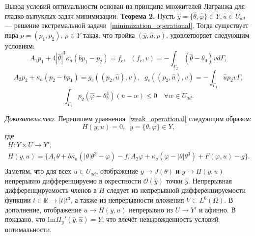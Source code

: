 Вывод условий оптимальности основан на принципе множителей
Лагранжа для гладко-выпуклых задач минимизации.
\textbf{Теорема 2.}
Пусть $\hat{y}=\{\hat{\theta},\hat{\varphi} \} \in Y, \hat{u} \in U_{ad}$
--- решение экстремальной задачи~\eqref{minimization_operational}.
Тогда существует пара $p = (p_1, p_2)$, $p \in Y$
такая, что тройка $(\hat{y}, \hat{u}, p)$, удовлетворяет следующим условиям:
\begin{equation}
    \label{therorem_2_eq1}
    A_1 p_1 + 4 |\hat{\theta}|^3 \kappa_a(b p_1 - p_2) = f_c,
    \;\; (f_c,v) = - \int_{\Gamma_2} (\hat{\theta} - \theta_0) v d\Gamma,
\end{equation}
\begin{equation}
    \label{therorem_2_eq2}
    A_2 p_2 + \kappa_a (p_2-b p_1) = g_c(( p_2, \hat{u}),v),
    \;\; g_c(( p_2, \hat{u}),v) = -\int_{\Gamma_1} \hat{u} p_2 v\Gamma,
\end{equation}
\begin{equation}
    \label{therorem_2_eq3}
    \int_{\Gamma_1} p_2 (\hat{\varphi} - \theta_b^4)(u-w) \leq 0 \quad \forall w \in U_{ad}.
\end{equation}


\textit{Доказательство.}
Перепишем уравнения~\eqref{weak_operational} следующим образом:
\[ H(y,u) = 0,\;\; y = \{\theta,\varphi\} \in Y, \]
где
\begin{gather*}
    H:Y \times U \to Y',\\
    H(y,u) =\{A_1 \theta + b \kappa_a (| \theta | \theta^3 - \varphi ) - f,
    A_2 \varphi + \kappa_a (\varphi - |\theta|\theta^3) + F(\varphi, u) - g \}.\\
\end{gather*}
Заметим, что для всех $u \in U_{ad}$, отображение $y \to J(\theta) $ и $y \to H(y,u)$ непрерывно
дифференцируемо в окрестности $\mathcal{O}(\hat{y})$ точки $\hat{y}$.
Непрерывная дифференцируемость членов в $H$ следует из непрерывной дифференцируемости
функции $t \in \mathbb{R} \to | t | t^3$, а также из непрерывности вложения  $V \subset L^6(\Omega)$.
В дополнение, отображение $u \to H(y,u)$ непрерывно из $U \to Y'$ и афинно.
В~\cite{cheb_origin} показано, что $\text{Im}H_y'(\hat{y}, \hat{u}) = Y$,
что влечёт невырожденность условий оптимальности.

